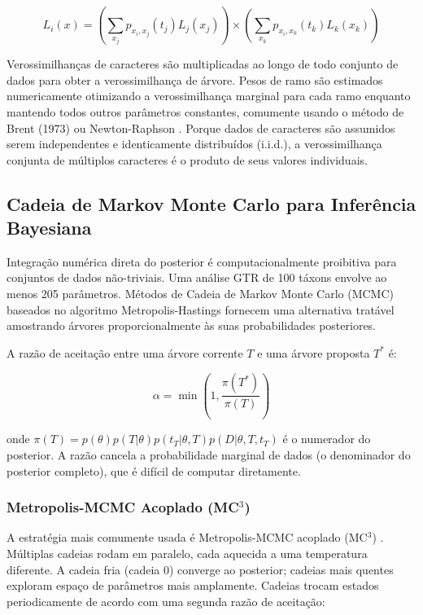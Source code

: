 $$L_i(x) = \left(\sum_{x_j} p_{x_i, x_j}(t_j) L_j(x_j)\right) \times \left(\sum_{x_k} p_{x_i, x_k}(t_k) L_k(x_k)\right)$$

Verossimilhanças de caracteres são multiplicadas ao longo de todo conjunto de dados para obter a verossimilhança de árvore. Pesos de ramo são estimados numericamente otimizando a verossimilhança marginal para cada ramo enquanto mantendo todos outros parâmetros constantes, comumente usando o método de Brent (1973) ou Newton-Raphson \parencite{ypma1995}. Porque dados de caracteres são assumidos serem independentes e identicamente distribuídos (i.i.d.), a verossimilhança conjunta de múltiplos caracteres é o produto de seus valores individuais.

\subsection{Cadeia de Markov Monte Carlo para Inferência Bayesiana}

Integração numérica direta do posterior é computacionalmente proibitiva para conjuntos de dados não-triviais. Uma análise GTR de 100 táxons envolve ao menos 205 parâmetros. Métodos de Cadeia de Markov Monte Carlo (MCMC) baseados no algoritmo Metropolis-Hastings \parencite{metropolis1953,hastings1970} fornecem uma alternativa tratável amostrando árvores proporcionalmente às suas probabilidades posteriores.

A razão de aceitação entre uma árvore corrente $T$ e uma árvore proposta $T^*$ é:

$$\alpha = \min\left(1, \frac{\pi(T^{*})}{\pi(T)}\right)$$

onde $\pi(T) = p(\theta) p(T|\theta) p(t_T|\theta, T) p(D|\theta, T, t_T)$ é o numerador do posterior. A razão cancela a probabilidade marginal de dados (o denominador do posterior completo), que é difícil de computar diretamente.

\subsubsection{Metropolis-MCMC Acoplado (MC$^3$)}

A estratégia mais comumente usada é Metropolis-MCMC acoplado (MC$^3$) \parencite{geyer1991}. Múltiplas cadeias rodam em paralelo, cada aquecida a uma temperatura diferente. A cadeia fria (cadeia 0) converge ao posterior; cadeias mais quentes exploram espaço de parâmetros mais amplamente. Cadeias trocam estados periodicamente de acordo com uma segunda razão de aceitação:


